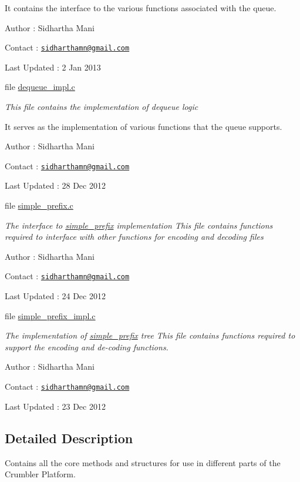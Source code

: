 \begin{DoxyCompactItemize}
\begin{DoxyCompactList}
 It contains the interface to the various functions associated with the queue.\par
 Author \-: Sidhartha Mani\par
 Contact \-: \href{mailto:sidharthamn@gmail.com}{\tt sidharthamn@gmail.\-com} \par
 Last Updated \-: 2 Jan 2013\par
 \end{DoxyCompactList}\item 
file \hyperlink{dequeue__impl_8c}{dequeue\-\_\-impl.\-c}
\begin{DoxyCompactList}\small\item\em This file contains the implementation of dequeue logic \par
 It serves as the implementation of various functions that the queue supports.\par
 Author \-: Sidhartha Mani\par
 Contact \-: \href{mailto:sidharthamn@gmail.com}{\tt sidharthamn@gmail.\-com} \par
 Last Updated \-: 28 Dec 2012\par
 \end{DoxyCompactList}\item 
file \hyperlink{simple__prefix_8c}{simple\-\_\-prefix.\-c}
\begin{DoxyCompactList}\small\item\em The interface to \hyperlink{structsimple__prefix}{simple\-\_\-prefix} implementation This file contains functions required to interface with other functions for encoding and decoding files\par
 Author \-: Sidhartha Mani\par
 Contact \-: \href{mailto:sidharthamn@gmail.com}{\tt sidharthamn@gmail.\-com} \par
 Last Updated \-: 24 Dec 2012 \par
 \end{DoxyCompactList}\item 
file \hyperlink{simple__prefix__impl_8c}{simple\-\_\-prefix\-\_\-impl.\-c}
\begin{DoxyCompactList}\small\item\em The implementation of \hyperlink{structsimple__prefix}{simple\-\_\-prefix} tree This file contains functions required to support the encoding and de-\/coding functions.\par
 Author \-: Sidhartha Mani\par
 Contact \-: \href{mailto:sidharthamn@gmail.com}{\tt sidharthamn@gmail.\-com} \par
 Last Updated \-: 23 Dec 2012 \par
 \end{DoxyCompactList}\end{DoxyCompactItemize}


\subsection{Detailed Description}
Contains all the core methods and structures for use in different parts of the Crumbler Platform. 